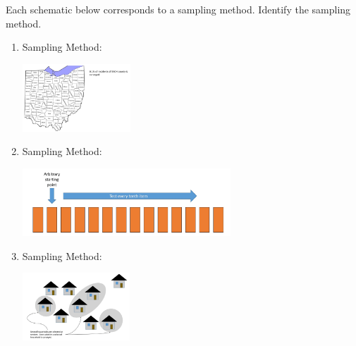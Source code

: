 \documentclass{ximera}
\begin{document}
\begin{problem}\label{prob:140hom1prob2}
Each schematic below corresponds to a sampling method.  Identify the sampling method.
\begin{enumerate}
    \item Sampling Method: 
    \begin{image}
   \includegraphics[height=1in]{140H1pic3.jpg}
 \end{image}
 \item Sampling Method: 
    \begin{image}
   \includegraphics[height=1in]{140H1pic1.jpg}
 \end{image}
 \item Sampling Method: 
    \begin{image}
   \includegraphics[height=1in]{140H1pic2.jpg}
 \end{image}
\end{enumerate}
\end{problem}
\end{document}
